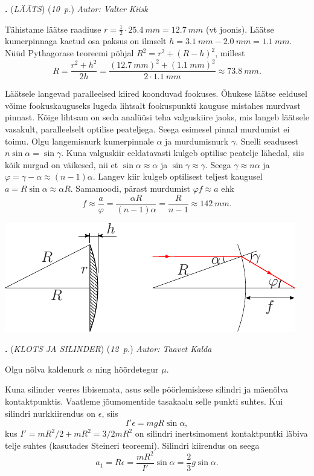 \documentclass[11pt,a5paper]{article}
\newcommand{\numb}[1]{\vspace{5pt}\textbf{\large #1}}
\newcommand{\nimi}[1]{(\textsl{\small #1})}
\newcommand{\punktid}[1]{(\emph{#1~p.})}
\newcounter{ylesanne}
\newcommand{\yl}[1]{\addtocounter{ylesanne}{1}\numb{\theylesanne.} \nimi{#1} \newblock{}}
\newcommand{\autor}[1]{\emph{ Autor: #1}}%
\begin{document}
\newpage

\yl{LÄÄTS}
\punktid{10} \autor{Valter Kiisk}

\osa Tähistame läätse raadiuse $r=\frac{1}{2}\cdot \SI{25.4}{mm}=\SI{12.7}{mm}$ (vt joonis). Läätse kumerpinnaga kaetud osa paksus on ilmselt $h = \SI{3.1}{mm} - \SI{2.0}{mm} = \SI{1.1}{mm}$. Nüüd Pythagorase teoreemi põhjal $R^2 = r^2 + (R - h)^2$, millest
\[
R = \frac{r^2 + h^2}{2h} = \frac{(\SI{12.7}{mm})^2 + (\SI{1.1}{mm})^2}{2\cdot \SI{1.1}{mm}}\approx \SI{73.8}{mm}.
\]

\osa Läätsele langevad paralleelsed kiired koonduvad fookuses. Õhukese läätse eeldusel võime fookuskauguseks lugeda lihtsalt fookuspunkti kauguse mistahes murdvast pinnast. Kõige lihtsam on seda analüüsi teha valguskiire jaoks, mis langeb läätsele vasakult, paralleelselt optilise peateljega. Seega esimesel pinnal murdumist ei toimu. Olgu langemisnurk kumerpinnale $\alpha$ ja murdumisnurk $\gamma$. Snelli seadusest $n\sin\alpha=\sin\gamma$. Kuna valguskiir eeldatavasti kulgeb optilise peatelje lähedal, siis kõik nurgad on väikesed, nii et $\sin\alpha\approx\alpha$ ja $\sin\gamma\approx\gamma$. Seega $\gamma\approx n\alpha$ ja $\varphi=\gamma-\alpha\approx(n-1)\alpha$. Langev kiir kulgeb optilisest teljest kaugusel $a=R\sin\alpha\approx \alpha R$. Samamoodi, pärast murdumist $\varphi f\approx a$ ehk
\[
f\approx\frac{a}{\varphi}=\frac{\alpha R}{(n-1)\alpha}=\frac{R}{n-1}\approx \SI{142}{mm}.
\]

\begin{center}
  \includegraphics{tasakumer-laats-lah}
\end{center}

\yl{KLOTS JA SILINDER}
\punktid{12} \autor{Taavet Kalda}

Olgu nõlva kaldenurk $\alpha$ ning hõõrdetegur $\mu$.

Kuna silinder veeres libisemata, asus selle pöörlemiskese silindri ja mäenõlva kontaktpunktis. Vaatleme jõumomentide tasakaalu selle punkti suhtes. Kui silindri nurkkiirendus on $\epsilon$, siis
\[
I'\epsilon = mgR\sin\alpha,
\]
kus $I' = mR^2/2 + mR^2 = 3/2 mR^2$ on silindri inertsimoment kontaktpuntki läbiva telje suhtes (kasutades Steineri teoreemi). Silindri kiirendus on seega
\[
a_1 = R\epsilon = \frac{mR^2}{I'} \sin\alpha = \frac{2}{3}g\sin\alpha.
\]
\end{document}
